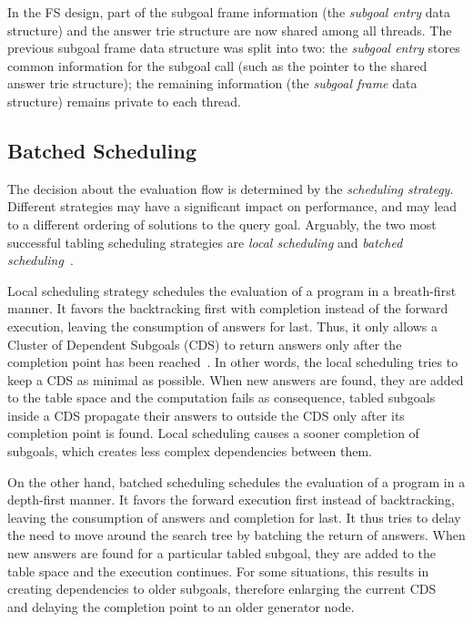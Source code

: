 \documentclass{llncs}
\begin{document}
In the FS design, part of the subgoal frame information (the
\emph{subgoal entry} data structure) and the answer trie structure are
now shared among all threads. The previous subgoal frame data
structure was split into two: the \emph{subgoal entry} stores common
information for the subgoal call (such as the pointer to the shared
answer trie structure); the remaining information (the \emph{subgoal
  frame} data structure) remains private to each thread.


\subsection{Batched Scheduling}

The decision about the evaluation flow is determined by the
\emph{scheduling strategy}. Different strategies may have a
significant impact on performance, and may lead to a different
ordering of solutions to the query goal. Arguably, the two most
successful tabling scheduling strategies are \emph{local scheduling}
and \emph{batched scheduling}~\cite{Freire-96}.

Local scheduling strategy schedules the evaluation of a program in a
breath-first manner. It favors the backtracking first with completion
instead of the forward execution, leaving the consumption of answers
for last. Thus, it only allows a Cluster of Dependent Subgoals (CDS)
to return answers only after the completion point has been
reached~\cite{Freire-96}. In other words, the local scheduling tries
to keep a CDS as minimal as possible. When new answers are found, they
are added to the table space and the computation fails as consequence,
tabled subgoals inside a CDS propagate their answers to outside the
CDS only after its completion point is found. Local scheduling causes
a sooner completion of subgoals, which creates less complex
dependencies between them.

On the other hand, batched scheduling schedules the evaluation of a
program in a depth-first manner. It favors the forward execution first
instead of backtracking, leaving the consumption of answers and
completion for last. It thus tries to delay the need to move around
the search tree by batching the return of answers. When new answers
are found for a particular tabled subgoal, they are added to the table
space and the execution continues. For some situations, this results
in creating dependencies to older subgoals, therefore enlarging the
current CDS~\cite{Sagonas-98} and delaying the completion point to an
older generator node.
\end{document}
